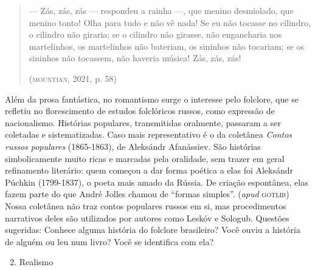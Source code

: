\documentclass[11pt]{extarticle}
\begin{document}
\begin{quote}
--- Zás, zás, zás --- respondeu a rainha ---, que menino desmiolado, que
menino tonto! Olha para tudo e não vê nada! Se eu não tocasse no
cilindro, o cilindro não giraria; se o cilindro não girasse, não
engancharia nos martelinhos, os martelinhos não bateriam, os sininhos
não tocariam; se os sininhos não tocassem, não haveria música! Zás, zás,
zás!

(\textsc{mountian}, 2021, p. 58)
\end{quote}

Além da prosa fantástica, no romantismo surge o interesse pelo
folclore, que se refletiu no florescimento de estudos folclóricos
russos, como expressão de nacionalismo. Histórias populares,
transmitidas oralmente, passaram a ser coletadas e sistematizadas. Caso
mais representativo é o da coletânea \emph{Contos russos populares}
(1865-1863)\emph{,} de Aleksándr Afanássiev. São histórias
simbolicamente muito ricas e marcadas pela oralidade, sem trazer em
geral refinamento literário: quem começou a dar forma poética a elas foi
Aleksándr Púchkin (1799-1837), o poeta mais amado da Rússia. De criação
espontânea, elas fazem parte do que André Jolles chamou de ``formas
simples''. (\emph{apud} \textsc{gotlib}) Nossa coletânea não traz contos
populares russos em si, mas procedimentos narrativos deles são
utilizados por autores como Leskóv e Sologub. Questões sugeridas:
Conhece alguma história do folclore brasileiro? Você ouviu a história de
alguém ou leu num livro? Você se identifica com ela?


\begin{enumerate}
\setcounter{enumi}{1}
\item Realismo
\end{enumerate}
\end{document}
